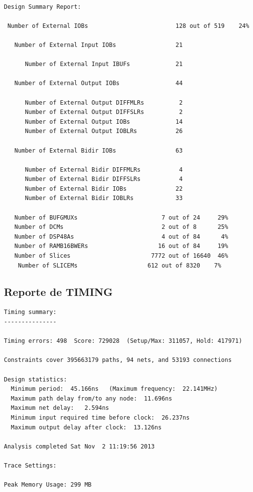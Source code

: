\begin{lstlisting}[frame=single,caption={Resultado de PAR},label={lst:salidas},breaklines]

Design Summary Report:

 Number of External IOBs                         128 out of 519    24%

   Number of External Input IOBs                 21

      Number of External Input IBUFs             21

   Number of External Output IOBs                44

      Number of External Output DIFFMLRs          2
      Number of External Output DIFFSLRs          2
      Number of External Output IOBs             14
      Number of External Output IOBLRs           26

   Number of External Bidir IOBs                 63

      Number of External Bidir DIFFMLRs           4
      Number of External Bidir DIFFSLRs           4
      Number of External Bidir IOBs              22
      Number of External Bidir IOBLRs            33

   Number of BUFGMUXs                        7 out of 24     29%
   Number of DCMs                            2 out of 8      25%
   Number of DSP48As                         4 out of 84      4%
   Number of RAMB16BWERs                    16 out of 84     19%
   Number of Slices                       7772 out of 16640  46%
    Number of SLICEMs                    612 out of 8320    7%

\end{lstlisting}

		\subsection{Reporte de TIMING}	

\begin{lstlisting}[frame=single,caption={Reporte timing},label={lst:salidas},breaklines]
Timing summary:
---------------

Timing errors: 498  Score: 729028  (Setup/Max: 311057, Hold: 417971)

Constraints cover 395663179 paths, 94 nets, and 53193 connections

Design statistics:
  Minimum period:  45.166ns   (Maximum frequency:  22.141MHz)
  Maximum path delay from/to any node:  11.696ns
  Maximum net delay:   2.594ns
  Minimum input required time before clock:  26.237ns
  Maximum output delay after clock:  13.126ns

Analysis completed Sat Nov  2 11:19:56 2013 

Trace Settings:

Peak Memory Usage: 299 MB
\end{lstlisting}


